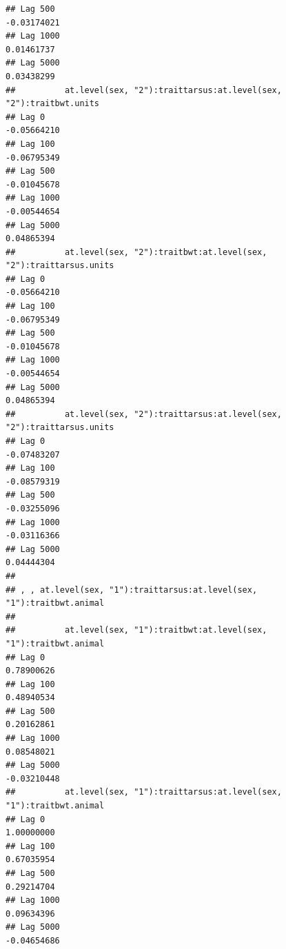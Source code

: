 \documentclass[
  12pt,
]{book}
\begin{document}
\begin{verbatim}
## Lag 500                                                    -0.03174021
## Lag 1000                                                    0.01461737
## Lag 5000                                                    0.03438299
##          at.level(sex, "2"):traittarsus:at.level(sex, "2"):traitbwt.units
## Lag 0                                                         -0.05664210
## Lag 100                                                       -0.06795349
## Lag 500                                                       -0.01045678
## Lag 1000                                                      -0.00544654
## Lag 5000                                                       0.04865394
##          at.level(sex, "2"):traitbwt:at.level(sex, "2"):traittarsus.units
## Lag 0                                                         -0.05664210
## Lag 100                                                       -0.06795349
## Lag 500                                                       -0.01045678
## Lag 1000                                                      -0.00544654
## Lag 5000                                                       0.04865394
##          at.level(sex, "2"):traittarsus:at.level(sex, "2"):traittarsus.units
## Lag 0                                                            -0.07483207
## Lag 100                                                          -0.08579319
## Lag 500                                                          -0.03255096
## Lag 1000                                                         -0.03116366
## Lag 5000                                                          0.04444304
## 
## , , at.level(sex, "1"):traittarsus:at.level(sex, "1"):traitbwt.animal
## 
##          at.level(sex, "1"):traitbwt:at.level(sex, "1"):traitbwt.animal
## Lag 0                                                        0.78900626
## Lag 100                                                      0.48940534
## Lag 500                                                      0.20162861
## Lag 1000                                                     0.08548021
## Lag 5000                                                    -0.03210448
##          at.level(sex, "1"):traittarsus:at.level(sex, "1"):traitbwt.animal
## Lag 0                                                           1.00000000
## Lag 100                                                         0.67035954
## Lag 500                                                         0.29214704
## Lag 1000                                                        0.09634396
## Lag 5000                                                       -0.04654686

\end{verbatim}
\end{document}
